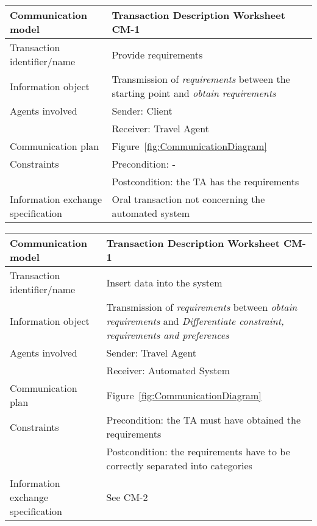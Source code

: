 \begin{tabular}%
		{|p{3cm}%
        |p{9cm}|}
\hline
{\bf Communication model} &
   {\bf Transaction Description Worksheet CM-1} \\
\hline
\hline
\sc Transaction identifier/name &
   {\rm Provide requirements } \\
\hline
\sc Information object &
   {\rm
   Transmission of \textit{requirements} between the starting point and \textit{obtain requirements}
   } \\
\hline
\sc Agents involved &
	{\rm Sender: Client} \\
	& {\rm Receiver: Travel Agent}\\
\hline
\sc Communication plan &
   {\rm
   Figure~\ref{fig:CommunicationDiagram}
   } \\
\hline
\sc Constraints &
   {\rm Precondition: - }\\
	& {\rm Postcondition: the TA has the requirements } \\
\hline
\sc Information exchange specification &
   {\rm
   Oral transaction not concerning the automated system
   } \\
\hline
\end{tabular}
\newline
\vspace{0.8 cm}
\newline
\noindent
\begin{tabular}%
		{|p{3cm}%
        |p{9cm}|}
\hline
{\bf Communication model} &
   {\bf Transaction Description Worksheet CM-1} \\
\hline
\hline
\sc Transaction identifier/name &
   {\rm Insert data into the system } \\
\hline
\sc Information object &
   {\rm
   Transmission of \textit{requirements} between \textit{obtain requirements} and \textit{Differentiate constraint, requirements and preferences}
   } \\
\hline
\sc Agents involved &
	{\rm Sender: Travel Agent} \\
	& {\rm Receiver: Automated System}\\
\hline
\sc Communication plan &
   {\rm
   Figure~\ref{fig:CommunicationDiagram}
   } \\
\hline
\sc Constraints &
   {\rm Precondition: the TA must have obtained the requirements}\\
	& {\rm Postcondition: the requirements have to be correctly separated into categories } \\
\hline
\sc Information exchange specification &
   {\rm
   See CM-2 
   } \\
\hline
\end{tabular}
